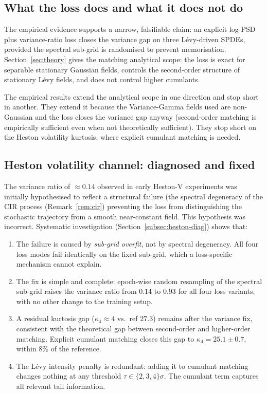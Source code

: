 \documentclass[review,12pt]{elsarticle}
\begin{document}
\subsection{What the loss does and what it does not do}

The empirical evidence supports a narrow, falsifiable claim: an
explicit log-PSD plus variance-ratio loss closes the variance gap
on three L\'evy-driven SPDEs, provided the spectral sub-grid is
randomised to prevent memorisation. Section~\ref{sec:theory} gives
the matching analytical scope: the loss is exact for separable
stationary Gaussian fields, controls the second-order structure of
stationary L\'evy fields, and does not control higher cumulants.

The empirical results extend the analytical scope in one direction
and stop short in another. They extend it because the
Variance-Gamma fields used are non-Gaussian and the loss closes
the variance gap anyway (second-order matching is empirically
sufficient even when not theoretically sufficient). They stop
short on the Heston volatility kurtosis, where explicit cumulant
matching is needed.

\subsection{Heston volatility channel: diagnosed and fixed}

The variance ratio of \(\approx 0.14\) observed in early Heston-V
experiments was initially hypothesised to reflect a structural
failure (the spectral degeneracy of the CIR process
(Remark~\ref{rem:cir}) preventing the loss from distinguishing
the stochastic trajectory from a smooth near-constant field. This
hypothesis was incorrect. Systematic investigation
(Section~\ref{subsec:heston-diag}) shows that:

\begin{enumerate}
\item The failure is caused by \emph{sub-grid overfit}, not by
spectral degeneracy. All four loss modes fail identically on the
fixed sub-grid, which a loss-specific mechanism cannot explain.

\item The fix is simple and complete: epoch-wise random resampling
of the spectral sub-grid raises the variance ratio from
\(0.14\) to \(0.93\) for all four loss variants, with no other
change to the training setup.

\item A residual kurtosis gap (\(\kappa_4 \approx 4\) vs.\ ref
\(27.3\)) remains after the variance fix, consistent with the
theoretical gap between second-order and higher-order matching.
Explicit cumulant matching closes this gap to
\(\kappa_4 = 25.1 \pm 0.7\), within 8\% of the reference.

\item The L\'evy intensity penalty is redundant: adding it to
cumulant matching changes nothing at any threshold
\(\tau \in \{2, 3, 4\}\sigma\). The cumulant term captures all
relevant tail information.
\end{enumerate}
\end{document}
